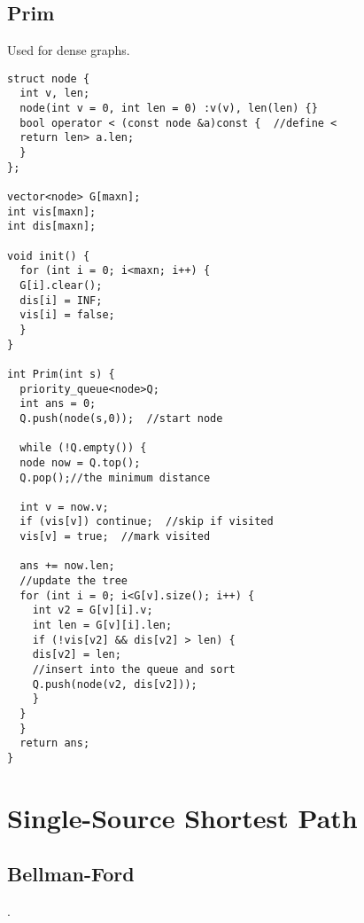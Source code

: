 \documentclass[11pt, a5paper, UTF8]{article}
\begin{document}
\subsection{Prim}
	Used for dense graphs.
\begin{lstlisting}
struct node {  
  int v, len;  
  node(int v = 0, int len = 0) :v(v), len(len) {}  
  bool operator < (const node &a)const {  //define <
  return len> a.len;  
  }  
};

vector<node> G[maxn];
int vis[maxn];
int dis[maxn];

void init() {  
  for (int i = 0; i<maxn; i++) {  
  G[i].clear();  
  dis[i] = INF;  
  vis[i] = false;  
  }  
}  

int Prim(int s) {  
  priority_queue<node>Q; 
  int ans = 0;  
  Q.push(node(s,0));  //start node
  
  while (!Q.empty()) {   
  node now = Q.top();
  Q.pop();//the minimum distance
  
  int v = now.v;  
  if (vis[v]) continue;  //skip if visited
  vis[v] = true;  //mark visited
  
  ans += now.len;  
  //update the tree
  for (int i = 0; i<G[v].size(); i++) {
    int v2 = G[v][i].v;  
    int len = G[v][i].len;  
    if (!vis[v2] && dis[v2] > len) {   
    dis[v2] = len;
    //insert into the queue and sort
    Q.push(node(v2, dis[v2]));  
    }  
  }  
  }  
  return ans; 
}  
\end{lstlisting}

\section{Single-Source Shortest Path}
\subsection{Bellman-Ford}.
\begin{lstlisting}

\end{lstlisting}
\end{document}
